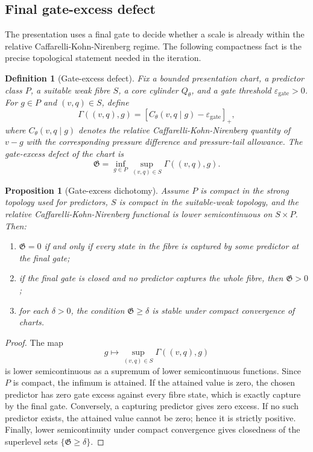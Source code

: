 \documentclass[11pt]{article}
\newtheorem{proposition}[theorem]{Proposition}
\newtheorem{definition}[theorem]{Definition}
\begin{document}
\subsection{Final gate-excess defect}

The presentation uses a final gate to decide whether a scale is already within
the relative Caffarelli-Kohn-Nirenberg regime.  The following compactness fact is
the precise topological statement needed in the iteration.

\begin{definition}[Gate-excess defect]
Fix a bounded presentation chart, a predictor class \(P\), a suitable weak fibre
\(S\), a core cylinder \(Q_\theta\), and a gate threshold
\(\varepsilon_{\mathrm{gate}}>0\).  For \(g\in P\) and \((v,q)\in S\), define
\[
\Gamma((v,q),g)
=
\left[
C_\theta(v,q\mid g)-\varepsilon_{\mathrm{gate}}
\right]_+,
\]
where \(C_\theta(v,q\mid g)\) denotes the relative Caffarelli-Kohn-Nirenberg
quantity of \(v-g\) with the corresponding pressure difference and pressure-tail
allowance.  The gate-excess defect of the chart is
\[
\mathfrak G
=
\inf_{g\in P}\sup_{(v,q)\in S}\Gamma((v,q),g).
\]
\end{definition}

\begin{proposition}[Gate-excess dichotomy]
Assume \(P\) is compact in the strong topology used for predictors, \(S\) is
compact in the suitable-weak topology, and the relative Caffarelli-Kohn-Nirenberg
functional is lower semicontinuous on \(S\times P\).  Then:
\begin{enumerate}[label=(\roman*)]
\item \(\mathfrak G=0\) if and only if every state in the fibre is captured by
some predictor at the final gate;
\item if the final gate is closed and no predictor captures the whole fibre, then
\(\mathfrak G>0\);
\item for each \(\delta>0\), the condition \(\mathfrak G\ge\delta\) is stable
under compact convergence of charts.
\end{enumerate}
\end{proposition}

\begin{proof}
The map
\[
g\mapsto \sup_{(v,q)\in S}\Gamma((v,q),g)
\]
is lower semicontinuous as a supremum of lower semicontinuous functions.  Since
\(P\) is compact, the infimum is attained.  If the attained value is zero, the
chosen predictor has zero gate excess against every fibre state, which is exactly
capture by the final gate.  Conversely, a capturing predictor gives zero excess.
If no such predictor exists, the attained value cannot be zero; hence it is
strictly positive.  Finally, lower semicontinuity under compact convergence gives
closedness of the superlevel sets \(\{\mathfrak G\ge\delta\}\).
\end{proof}
\end{document}
